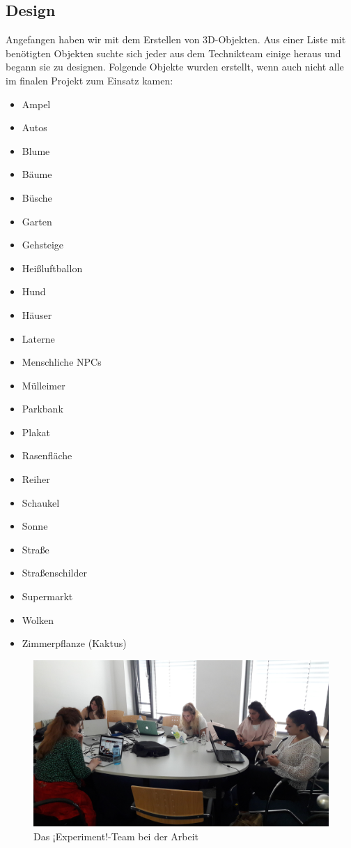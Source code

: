 \documentclass{Bericht}
\begin{document}
	\subsection{Design} %
		Angefangen haben wir mit dem Erstellen von 3D-Objekten. Aus einer Liste mit benötigten Objekten suchte sich jeder aus dem Technikteam einige heraus und begann sie zu designen. Folgende Objekte wurden erstellt, wenn auch nicht alle im finalen Projekt zum Einsatz kamen:
		
		\begin{itemize}
			\setlength{\itemsep}{0em}
			\item Ampel
			\item Autos
			\item Blume
			\item Bäume
			\item Büsche
			\item Garten
			\item Gehsteige
			\item Heißluftballon
			\item Hund
			\item Häuser
			\item Laterne
			\item Menschliche NPCs
			\item Mülleimer
			\item Parkbank
			\item Plakat
			\item Rasenfläche
			\item Reiher
			\item Schaukel
			\item Sonne
			\item Straße
			\item Straßenschilder
			\item Supermarkt
			\item Wolken
			\item Zimmerpflanze (Kaktus)
		\end{itemize}
		
		\begin{figure}[!htbp] %
			\centering
			\includegraphics[width=\linewidth, height=\textheight, keepaspectratio]{Bilder/20170518_103125.jpg}
			\caption{Das ¡Experiment!-Team bei der Arbeit}
			\label{img:experiment-team-bei-der-arbeit}
		\end{figure}
\end{document}
